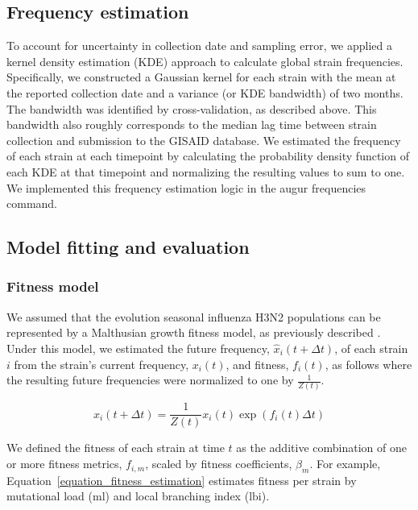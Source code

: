 \subsection{Frequency estimation}

To account for uncertainty in collection date and sampling error, we applied a kernel density estimation (KDE) approach to calculate global strain frequencies.
Specifically, we constructed a Gaussian kernel for each strain with the mean at the reported collection date and a variance (or KDE bandwidth) of two months.
The bandwidth was identified by cross-validation, as described above.
This bandwidth also roughly corresponds to the median lag time between strain collection and submission to the GISAID database.
We estimated the frequency of each strain at each timepoint by calculating the probability density function of each KDE at that timepoint and normalizing the resulting values to sum to one.
We implemented this frequency estimation logic in the augur frequencies command.

\subsection{Model fitting and evaluation}

\subsubsection{Fitness model}

We assumed that the evolution seasonal influenza H3N2 populations can be represented by a Malthusian growth fitness model, as previously described \citep{Luksza:2014hj}.
Under this model, we estimated the future frequency, $\hat{x}_{i}(t + \Delta{t})$, of each strain $i$ from the strain's current frequency, $x_{i}(t)$, and fitness, $f_{i}(t)$, as follows where the resulting future frequencies were normalized to one by $\frac{1}{Z(t)}$.

\begin{equation}
    \hat{x}_{i}(t + \Delta{t}) = \frac{1}{Z(t)}x_{i}(t)\exp(f_{i}(t)\Delta{t})
    \label{equation_exponential_growth_model}
\end{equation}

We defined the fitness of each strain at time $t$ as the additive combination of one or more fitness metrics, $f_{i,m}$, scaled by fitness coefficients, $\beta_{m}$.
For example, Equation~\ref{equation_fitness_estimation} estimates fitness per strain by mutational load ($\mathrm{ml}$) and local branching index ($\mathrm{lbi}$).

